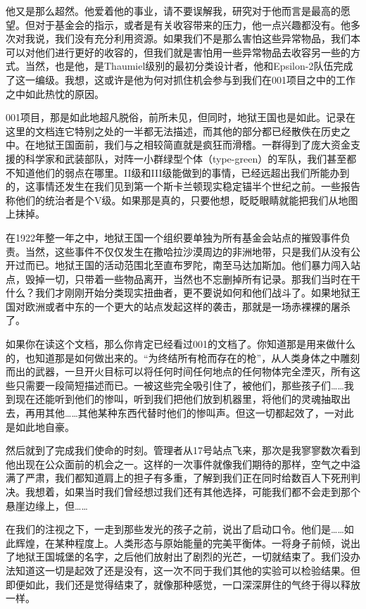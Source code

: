 他又是那么超然。他爱着他的事业，请不要误解我，研究对于他而言是最高的愿望。但对于基金会的指示，或者是有关收容带来的压力，他一点兴趣都没有。他多次对我说，我们没有充分利用资源。如果我们不是那么害怕这些异常物品，我们本可以对他们进行更好的收容的，但我们就是害怕用一些异常物品去收容另一些的方式。当然，也是他，是Thaumiel级别的最初分类设计者，他和Epsilon-2队伍完成了这一编级。我想，这或许是他为何对抓住机会参与到我们在001项目之中的工作之中如此热忱的原因。

001项目，那是如此地超凡脱俗，前所未见，但同时，地狱王国也是如此。记录在这里的文档连它特别之处的一半都无法描述，而其他的部分都已经散佚在历史之中。在地狱王国面前，我们与之相较简直就是疯狂而滑稽。一群得到了庞大资金支援的科学家和武装部队，对阵一小群绿型个体（type-green）的军队，我们甚至都不知道他们的弱点在哪里。II级和III级能做到的事情，已经远超出我们所能办到的，这事情还发生在我们见到第一个斯卡兰顿现实稳定锚半个世纪之前。一些报告称他们的统治者是个V级。如果那是真的，只要他想，眨眨眼睛就能把我们从地图上抹掉。

在1922年整一年之中，地狱王国一个组织要单独为所有基金会站点的摧毁事件负责。当然，这些事件不仅仅发生在撒哈拉沙漠周边的非洲地带，只是我们从没有公开过而已。地狱王国的活动范围北至直布罗陀，南至马达加斯加。他们暴力闯入站点，毁掉一切，只带着一些物品离开，当然也不忘删掉所有记录。那我们当时在干什么？我们才刚刚开始分类现实扭曲者，更不要说如何和他们战斗了。如果地狱王国对欧洲或者中东的一个更大的站点发起这样的袭击，那就是一场赤裸裸的屠杀了。

如果你在读这个文档，那么你肯定已经看过001的文档了。你知道那是用来做什么的，也知道那是如何做出来的。“为终结所有枪而存在的枪”，从人类身体之中雕刻而出的武器，一旦开火目标可以将任何时间任何地点的任何物体完全湮灭，所有这些只需要一段简短描述而已。一被这些完全吸引住了，被他们，那些孩子们……我到现在还能听到他们的惨叫，听到我们把他们放到机器里，将他们的灵魂抽取出去，再用其他……其他某种东西代替时他们的惨叫声。但这一切都起效了，一对此是如此地自豪。

然后就到了完成我们使命的时刻。管理者从17号站点飞来，那次是我寥寥数次看到他出现在公众面前的机会之一。这样的一次事件就像我们期待的那样，空气之中溢满了严肃，我们都知道肩上的担子有多重，了解到我们正在同时给数百人下死刑判决。我想着，如果当时我们曾经想过我们还有其他选择，可能我们都不会走到那个悬崖边缘上，但……

在我们的注视之下，一走到那些发光的孩子之前，说出了启动口令。他们是……如此辉煌，在某种程度上。人类形态与原始能量的完美平衡体。一将身子前倾，说出了地狱王国城堡的名字，之后他们放射出了剧烈的光芒，一切就结束了。我们没办法知道这一切是起效了还是没有，这一次不同于我们其他的实验可以检验结果。但即便如此，我们还是觉得结束了，就像那种感觉，一口深深屏住的气终于得以释放一样。

